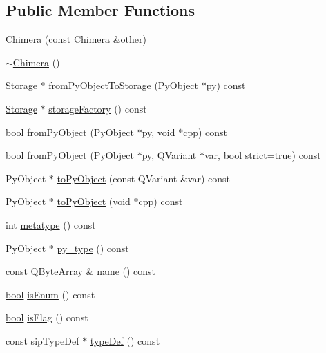 \subsection*{Public Member Functions}
\begin{DoxyCompactItemize}
\item 
\hyperlink{classChimera_a7c41eabaca97e23fcaecb21a90d6a47b}{Chimera} (const \hyperlink{classChimera}{Chimera} \&other)
\item 
\hyperlink{classChimera_ade5ded67264157e0a23f524eb0a43f75}{$\sim$\+Chimera} ()
\item 
\hyperlink{classChimera_1_1Storage}{Storage} $\ast$ \hyperlink{classChimera_aaebfad3c02c22577a94ba10b8920461d}{from\+Py\+Object\+To\+Storage} (Py\+Object $\ast$py) const 
\item 
\hyperlink{classChimera_1_1Storage}{Storage} $\ast$ \hyperlink{classChimera_a1e8aef4654ab68f6c534588b49859e4c}{storage\+Factory} () const 
\item 
\hyperlink{compiler_8h_abb452686968e48b67397da5f97445f5b}{bool} \hyperlink{classChimera_a99ccc71f2b6a297860e050b9bf81321e}{from\+Py\+Object} (Py\+Object $\ast$py, void $\ast$cpp) const 
\item 
\hyperlink{compiler_8h_abb452686968e48b67397da5f97445f5b}{bool} \hyperlink{classChimera_af4c8bfdf65865199df6228edd2637927}{from\+Py\+Object} (Py\+Object $\ast$py, Q\+Variant $\ast$var, \hyperlink{compiler_8h_abb452686968e48b67397da5f97445f5b}{bool} strict=\hyperlink{compiler_8h_a41f9c5fb8b08eb5dc3edce4dcb37fee7}{true}) const 
\item 
Py\+Object $\ast$ \hyperlink{classChimera_ad207c609ea9e1383e91210f8310e25b7}{to\+Py\+Object} (const Q\+Variant \&var) const 
\item 
Py\+Object $\ast$ \hyperlink{classChimera_aa7a25d2c11fec270610b6657ab173dbd}{to\+Py\+Object} (void $\ast$cpp) const 
\item 
int \hyperlink{classChimera_a52de1a25c04fbfe7529bb0193692ad7c}{metatype} () const 
\item 
Py\+Object $\ast$ \hyperlink{classChimera_a41cd4fb9a066119130f1e1d8900454bf}{py\+\_\+type} () const 
\item 
const Q\+Byte\+Array \& \hyperlink{classChimera_a3f4fa9aed5e25294d82e861a451b8681}{name} () const 
\item 
\hyperlink{compiler_8h_abb452686968e48b67397da5f97445f5b}{bool} \hyperlink{classChimera_aa39d69f6d7e8b4a580a7db65b637c09b}{is\+Enum} () const 
\item 
\hyperlink{compiler_8h_abb452686968e48b67397da5f97445f5b}{bool} \hyperlink{classChimera_a8e8577bb9367f99dcabc2821f6b8d7a4}{is\+Flag} () const 
\item 
const sip\+Type\+Def $\ast$ \hyperlink{classChimera_a0335bfb09561aa6258236e9d9b350269}{type\+Def} () const 
\end{DoxyCompactItemize}
